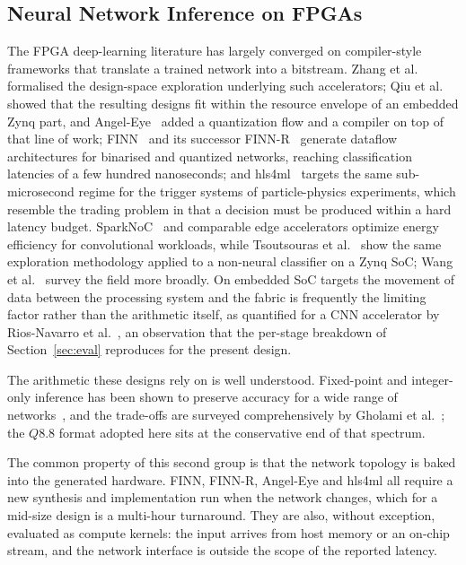 \documentclass[final,5p,times,twocolumn]{elsarticle}
\begin{document}
\subsection{Neural Network Inference on FPGAs}
The FPGA deep-learning literature has largely converged on compiler-style
frameworks that translate a trained network into a bitstream. Zhang et
al.~\cite{Zhang2015} formalised the design-space exploration underlying such
accelerators; Qiu et al.~\cite{Qiu2016} showed that the resulting designs fit
within the resource envelope of an embedded Zynq part, and Angel-Eye~\cite{Guo2018}
added a quantization flow and a compiler on top of that line of work; FINN~\cite{Umuroglu2017} and its successor
FINN-R~\cite{Blott2018} generate dataflow architectures for binarised and
quantized networks, reaching classification latencies of a few hundred
nanoseconds; and hls4ml~\cite{Duarte2018} targets the same sub-microsecond
regime for the trigger systems of particle-physics experiments, which resemble
the trading problem in that a decision must be produced within a hard latency
budget. SparkNoC~\cite{sparknoc} and comparable edge accelerators optimize
energy efficiency for convolutional workloads, while
Tsoutsouras et al.~\cite{Tsoutsouras2017} show the same
exploration methodology applied to a non-neural classifier on a Zynq SoC;
Wang et al.~\cite{Wang2019survey} survey the field more broadly.
On embedded SoC targets the movement of data between the processing system and
the fabric is frequently the limiting factor rather than the arithmetic itself,
as quantified for a CNN accelerator by Rios-Navarro et
al.~\cite{RiosNavarro2018}, an observation that the per-stage breakdown of
Section~\ref{sec:eval} reproduces for the present design.

The arithmetic these designs rely on is well understood. Fixed-point and
integer-only inference has been shown to preserve accuracy for a wide range of
networks~\cite{Jacob2018,Hubara2017}, and the trade-offs are surveyed
comprehensively by Gholami et al.~\cite{Gholami2021}; the $Q8.8$ format adopted
here sits at the conservative end of that spectrum.

The common property of this second group is that the network topology is baked
into the generated hardware. FINN, FINN-R, Angel-Eye and hls4ml all require a
new synthesis and implementation run when the network changes, which for a
mid-size design is a multi-hour turnaround. They are also, without exception,
evaluated as compute kernels: the input arrives from host memory or an on-chip
stream, and the network interface is outside the scope of the reported latency.
\end{document}
